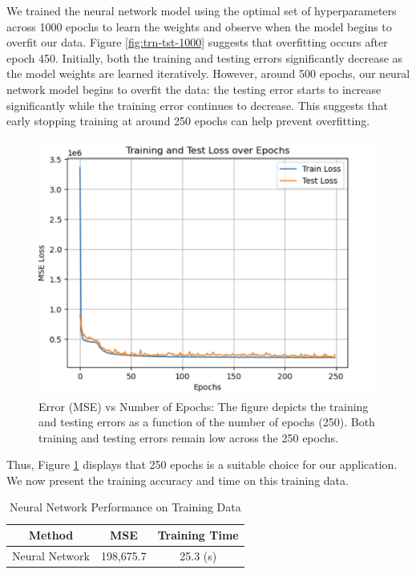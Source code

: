 \documentclass[conference]{IEEEtran}
\begin{document}
We trained the neural network model using the optimal set of hyperparameters across 1000 epochs to learn the weights and observe when the model begins to overfit our data. Figure \ref{fig:trn-tst-1000} suggests that overfitting occurs after epoch 450. Initially, both the training and testing errors significantly decrease as the model weights are learned iteratively. However, around 500 epochs, our neural network model begins to overfit the data: the testing error starts to increase significantly while the training error continues to decrease. This suggests that early stopping training at around 250 epochs can help prevent overfitting.

\begin{figure}[H]
    \centering
    \includegraphics[width=0.8\linewidth]{250.png} %
    \caption{Error (MSE) vs Number of Epochs: The figure depicts the training and testing errors as a function of the number of epochs (250). Both training and testing errors remain low across the 250 epochs.}
    \label{fig:trn-test-250}
\end{figure}

Thus, Figure \ref{fig:trn-test-250} displays that 250 epochs is a suitable choice for our application. We now present the training accuracy and time on this training data. 

\begin{table}[H]
\centering
\caption{Neural Network Performance on Training Data}
\begin{tabular}{|c|c|c|}
\hline
Method & MSE & Training Time \\
\hline
Neural Network & 198,675.7 & 25.3 (s)  \\
\hline
\end{tabular}
\label{tab:mytable}
\end{table}
\end{document}
